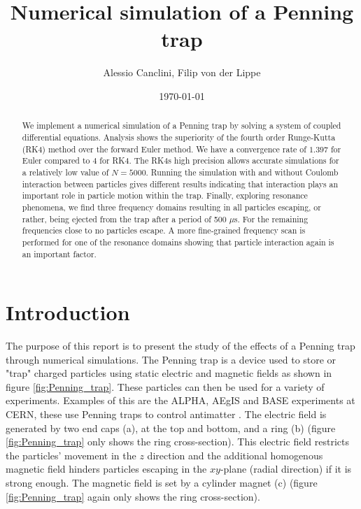 \documentclass[english,notitlepage,reprint,nofootinbib]{revtex4-1}  %
\begin{document}
\raggedbottom

\title{Numerical simulation of a Penning trap}  %
\author{Alessio Canclini, Filip von der Lippe} %
\date{\today}                             %
\noaffiliation                            %

\begin{abstract}
    We implement a numerical simulation of a Penning trap by solving a system of coupled differential equations. Analysis shows the superiority of the fourth order Runge-Kutta (RK4) method over the forward Euler method. We have a convergence rate of $1.397$ for Euler compared to $4$ for RK4. The RK4s high precision allows accurate simulations for a relatively low value of $N= 5000$. Running the simulation with and without Coulomb interaction between particles gives different results indicating that interaction plays an important role in particle motion within the trap. Finally, exploring resonance phenomena, we find three frequency domains resulting in all particles escaping, or rather, being ejected from the trap after a period of 500 $\mu$s. For the remaining frequencies close to no particles escape. A more fine-grained frequency scan is performed for one of the resonance domains showing that particle interaction again is an important factor.
\end{abstract}
\maketitle


\section{Introduction}
The purpose of this report is to present the study of the effects of a Penning trap through numerical simulations. The Penning trap is a device used to store or "trap" charged particles
using static electric and magnetic fields as shown in figure \ref{fig:Penning_trap}. These particles can then be used for a variety of experiments. Examples of this are the ALPHA, AEgIS and BASE
experiments at CERN, these use Penning traps to control antimatter \cite{project}.
The electric field is generated by two end caps (a), at the top and bottom,
and a ring (b) (figure \ref{fig:Penning_trap} only shows the ring cross-section).
This electric field restricts the particles' movement in the $z$ direction and the additional homogenous magnetic field
hinders particles escaping in the $xy$-plane (radial direction) if it is strong enough. The magnetic field is set by
a cylinder magnet (c) (figure \ref{fig:Penning_trap} again only shows the ring cross-section).
\end{document}
